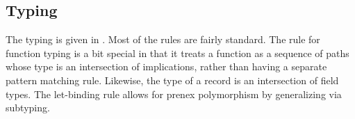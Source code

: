 \documentclass[acmsmall]{acmart}
\theoremstyle{definition}
\begin{document}
\subsection{Typing}
The typing is given in .
Most of the rules are fairly standard. 
The rule for function typing is a bit special in that
it treats a function as a sequence of paths whose type is an intersection of implications,
rather than having a separate pattern matching rule. 
Likewise, the type of a record is an intersection of field types.
The let-binding rule allows for prenex polymorphism by generalizing via subtyping. 










\end{document}

